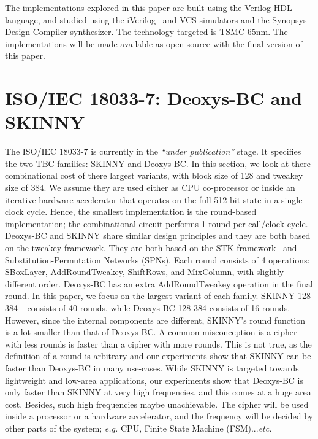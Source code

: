 \documentclass[conference]{IEEEtran}
\begin{document}
The implementations explored in this paper are built using the Verilog HDL language, and studied using the iVerilog~\cite{iverilog} and VCS simulators and the Synopsys Design Compiler synthesizer. The technology targeted is TSMC 65nm. The implementations will be made available as open source with the final version of this paper.

\section{ISO/IEC 18033-7: Deoxys-BC and SKINNY}\label{sec:tbc}

The ISO/IEC 18033-7 is currently in the {\it ``under publication''} stage. It specifies the two TBC families: SKINNY and Deoxys-BC. In this section, we look at there combinational cost of there largest variants, with block size of 128 and tweakey size of 384. We assume they are used either as CPU co-processor or inside an iterative hardware accelerator that operates on the full 512-bit state in a single clock cycle. Hence, the smallest implementation is the round-based implementation; the combinational circuit performs 1 round per call/clock cycle. Deoxys-BC and SKINNY share similar design principles and they are both based on the tweakey framework. They are both based on the STK framework~\cite{jean2014tweaks} and Substitution-Permutation Networks (SPNs). Each round consists of 4 operations: SBoxLayer, AddRoundTweakey, ShiftRows, and MixColumn, with slightly different order. Deoxys-BC has an extra AddRoundTweakey operation in the final round. In this paper, we focus on the largest variant of each family. SKINNY-128-384+ consists of 40 rounds, while Deoxys-BC-128-384 consists of 16 rounds. However, since the internal components are different, SKINNY's round function is a lot smaller than that of Deoxys-BC. A common misconception is a cipher with less rounds is faster than a cipher with more rounds. This is not true, as the definition of a round is arbitrary and our experiments show that SKINNY can be faster than Deoxys-BC in many use-cases. While SKINNY is targeted towards lightweight and low-area applications, our experiments show that Deoxys-BC is only faster than SKINNY at very high frequencies, and this comes at a huge area cost. Besides, such high frequencies maybe unachievable. The cipher will be used inside a processor or a hardware accelerator, and the frequency will be decided by other parts of the system; {\it e.g.} CPU, Finite State Machine (FSM)...{\it etc.}
\end{document}
